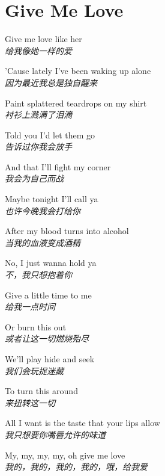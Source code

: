 \section{Give Me Love}

\thispagestyle{empty}


\begin{spacing}{1.5}
\begin{flushleft}
Give me love like her\\
\textit{给我像她一样的爱}\lyricspace

'Cause lately I've been waking up alone\\
\textit{因为最近我总是独自醒来}\lyricspace

Paint splattered teardrops on my shirt\\
\textit{衬衫上溅满了泪滴}\lyricspace

Told you I'd let them go\\
\textit{告诉过你我会放手}\lyricspace

And that I'll fight my corner\\
\textit{我会为自己而战}\lyricspace

Maybe tonight I'll call ya\\
\textit{也许今晚我会打给你}\lyricspace

After my blood turns into alcohol\\
\textit{当我的血液变成酒精}\lyricspace

No, I just wanna hold ya\\
\textit{不，我只想抱着你}\lyricspace

Give a little time to me\\
\textit{给我一点时间}\lyricspace

Or burn this out\\
\textit{或者让这一切燃烧殆尽}\lyricspace

We'll play hide and seek\\
\textit{我们会玩捉迷藏}\lyricspace

To turn this around\\
\textit{来扭转这一切}\lyricspace

All I want is the taste that your lips allow\\
\textit{我只想要你嘴唇允许的味道}\lyricspace

My, my, my, my, oh give me love\\
\textit{我的，我的，我的，我的，哦，给我爱}\lyricspace


\end{flushleft}
\end{spacing}
